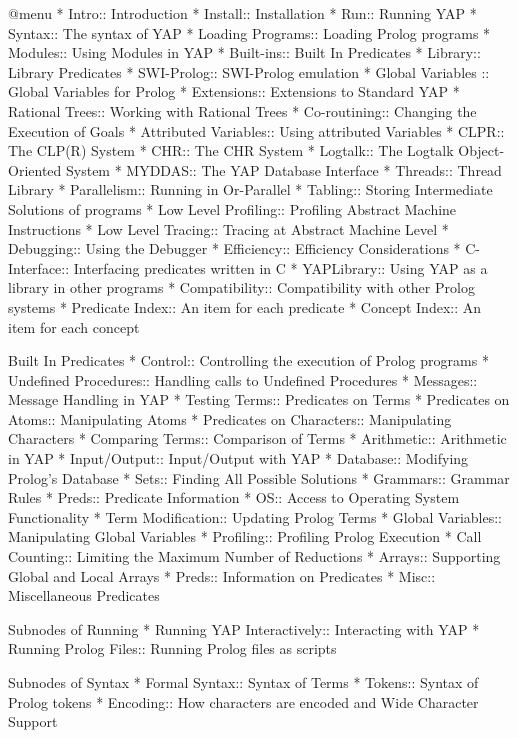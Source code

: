 @menu
* Intro:: Introduction
* Install:: Installation
* Run:: Running YAP
* Syntax:: The syntax of YAP
* Loading Programs:: Loading Prolog programs
* Modules:: Using Modules in YAP
* Built-ins:: Built In Predicates
* Library:: Library Predicates
* SWI-Prolog:: SWI-Prolog emulation
* Global Variables ::  Global Variables for Prolog
* Extensions:: Extensions to Standard YAP
* Rational Trees:: Working with Rational Trees
* Co-routining:: Changing the Execution of Goals
* Attributed Variables:: Using attributed Variables
* CLPR:: The CLP(R) System
* CHR:: The CHR System
* Logtalk:: The Logtalk Object-Oriented System
* MYDDAS:: The YAP Database Interface
* Threads:: Thread Library
* Parallelism:: Running in Or-Parallel
* Tabling:: Storing Intermediate Solutions of programs 
* Low Level Profiling:: Profiling Abstract Machine Instructions
* Low Level Tracing:: Tracing at Abstract Machine Level
* Debugging:: Using the Debugger
* Efficiency:: Efficiency Considerations
* C-Interface:: Interfacing predicates written in C
* YAPLibrary:: Using YAP as a library in other programs
* Compatibility:: Compatibility with other Prolog systems
* Predicate Index:: An item for each predicate
* Concept Index:: An item for each concept

Built In Predicates
* Control:: Controlling the execution of Prolog programs
* Undefined Procedures:: Handling calls to Undefined Procedures
* Messages:: Message Handling in YAP
* Testing Terms:: Predicates on Terms
* Predicates on Atoms:: Manipulating Atoms
* Predicates on Characters:: Manipulating Characters
* Comparing Terms:: Comparison of Terms
* Arithmetic:: Arithmetic in YAP
* Input/Output:: Input/Output with YAP
* Database:: Modifying Prolog's Database
* Sets:: Finding All Possible Solutions
* Grammars:: Grammar Rules
* Preds:: Predicate Information
* OS:: Access to Operating System Functionality
* Term Modification:: Updating Prolog Terms
* Global Variables:: Manipulating Global Variables
* Profiling:: Profiling Prolog Execution
* Call Counting:: Limiting the Maximum Number of Reductions
* Arrays:: Supporting Global and Local Arrays
* Preds:: Information on Predicates
* Misc:: Miscellaneous Predicates


Subnodes of Running
* Running YAP Interactively:: Interacting with YAP
* Running Prolog Files:: Running Prolog files as scripts

Subnodes of Syntax
* Formal Syntax:: Syntax of Terms
* Tokens:: Syntax of Prolog tokens
* Encoding:: How characters are encoded and Wide Character Support

